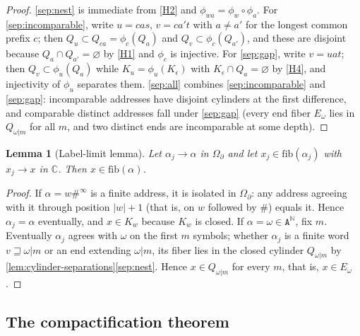 \documentclass[11pt,reqno]{amsart}
\numberwithin{equation}{section}
\theoremstyle{plain}
\newtheorem{lemma}[theorem]{Lemma}
\theoremstyle{definition}
\theoremstyle{remark}
\newcommand{\C}{\mathbb C}
\newcommand{\N}{\mathbb N}
\newcommand{\A}{\mathtt A}
\newcommand{\Ends}{\A^{\N}}
\newcommand{\OmB}{\Omega_\partial}
\newcommand{\rootK}{K_{\epsilon}}
\begin{document}
\begin{proof}
\ref{sep:nest} is immediate from \ref{H2} and
$\phi_{wa}=\phi_w\circ\phi_a$.  For \ref{sep:incomparable}, write
$u=cas$, $v=ca't$ with $a\ne a'$ for the longest common prefix $c$; then
$Q_u\subset Q_{ca}=\phi_c(Q_a)$ and $Q_v\subset\phi_c(Q_{a'})$, and
these are disjoint because $Q_a\cap Q_{a'}=\varnothing$ by \ref{H1} and
$\phi_c$ is injective.  For \ref{sep:gap}, write $v=uat$; then
$Q_v\subset\phi_u(Q_a)$ while $K_u=\phi_u(\rootK)$ with
$\rootK\cap Q_a=\varnothing$ by \ref{H4}, and injectivity of $\phi_u$
separates them.  \ref{sep:all} combines \ref{sep:incomparable} and
\ref{sep:gap}: incomparable addresses have disjoint cylinders at the
first difference, and comparable distinct addresses fall under
\ref{sep:gap} (every end fiber $E_\omega$ lies in
$Q_{\omega|m}$ for all $m$, and two distinct ends are incomparable at
some depth).
\end{proof}

\begin{lemma}[Label-limit lemma]
\label{lem:label-limit}
Let $\alpha_j\to\alpha$ in $\OmB$ and let $x_j\in\mathrm{fib}(\alpha_j)$
with $x_j\to x$ in $\C$.  Then $x\in\mathrm{fib}(\alpha)$.
\end{lemma}

\begin{proof}
If $\alpha=w\#^\infty$ is a finite address, it is isolated in $\OmB$:
any address agreeing with it through position $|w|+1$ (that is, on $w$
followed by $\#$) equals it.  Hence $\alpha_j=\alpha$ eventually, and
$x\in K_w$ because $K_w$ is closed.  If $\alpha=\omega\in\Ends$, fix
$m$.  Eventually $\alpha_j$ agrees with $\omega$ on the first $m$
symbols; whether $\alpha_j$ is a finite word $v\sqsupseteq\omega|m$ or
an end extending $\omega|m$, its fiber lies in the closed cylinder
$Q_{\omega|m}$ by \cref{lem:cylinder-separations}\ref{sep:nest}.  Hence
$x\in Q_{\omega|m}$ for every $m$, that is,
$x\in E_\omega$.
\end{proof}

\subsection{The compactification theorem}
\end{document}
